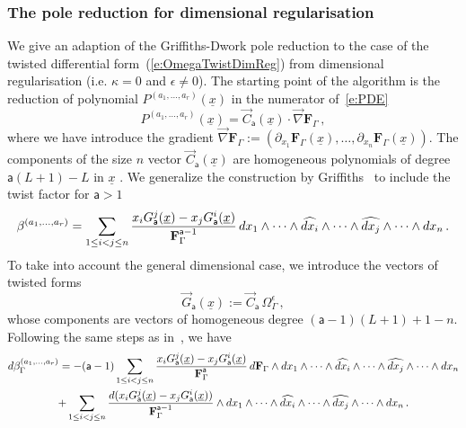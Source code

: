 \documentclass[a4paper,12pt]{article}
\numberwithin{equation}{section}
\numberwithin{figure}{section}
\begin{document}
  \subsubsection{The pole reduction for dimensional
    regularisation}\label{sec:PoleRed}
We give an adaption of the Griffiths-Dwork pole reduction to the case
of the twisted differential form~(\ref{e:OmegaTwistDimReg}) from
dimensional regularisation (i.e. $\kappa=0$ and $\epsilon\neq0$).
The starting point of the algorithm is the reduction of polynomial
$P^{(a_1,\dots,a_r)}(\underline x)$  in the numerator
of~\eqref{e:PDE}
\begin{equation}\label{e:RedF}
	P^{(a_1,\dots,a_r)}(\underline x) = \vec C_{\mathsf{a}}(\underline x)\cdot
	\vec\nabla   \textbf{F}_\Gamma \, ,
      \end{equation}
      where we have introduce the gradient $	\vec\nabla   \textbf{F}_\Gamma :=\left(\partial_{x_1}
      \textbf{F}_\Gamma(\underline x),\dots, \partial_{x_n}
      \textbf{F}_\Gamma(\underline x)\right)$.
%
The components of the size $n$ vector $ \vec C_{\mathsf{a}}(\underline x)$ are homogeneous polynomials of degree
$\mathsf{a}(L+1)-L$ in  $\underline x$ . 
%
   We generalize the construction by
   Griffiths~\cite{Griffith1,Griffith2} to include the twist factor
   for $\mathsf{a}>1$ 
   \begin{equation}\label{e:betadef}
  \beta^{(a_1,\dots,a_r)}=  \sum_{1\leq i<j\leq n} {x_i
    G_{\mathsf{a}}^j  (\underline x)-x_j
   G_{\mathsf{a}}^i(\underline x)\over
  \textbf{F}_\Gamma^{\mathsf{a}-1}}\, 
 dx_1\wedge \cdots \wedge \widehat{dx_i}\wedge \cdots \wedge\widehat{dx_j}\wedge
  \cdots \wedge dx_n \, .
\end{equation}
To take into account the general dimensional case, we introduce 
the vectors of twisted forms
\begin{equation}
  \label{e:Gdef}
\vec  G_{\mathsf{a}}(\underline x):=   \vec C_{\mathsf{a}} \,\Omega_\Gamma^\epsilon \, ,
\end{equation}
whose components are vectors of homogeneous degree $(\mathsf{a}-1)(L+1)+1-n$. 
Following the same steps as in~\cite{Griffiths_1969}, we have
\begin{multline}
  d\beta_\Gamma^{(a_1,\dots,a_r)}=-  (\mathsf{a}-1) \sum_{1\leq i<j\leq n} {x_i
    G_{\mathsf{a}}^j  (\underline x)-x_j
   G_{\mathsf{a}}^i(\underline x)\over
   \textbf{F}_\Gamma^{\mathsf{a}}}\, d \textbf{F}_\Gamma\wedge
 dx_1\wedge \cdots \wedge \widehat{dx_i}\wedge \cdots \wedge\widehat{dx_j}\wedge
 \cdots \wedge dx_n \cr
+  \sum_{1\leq i<j\leq n} {d(x_i
    G_{\mathsf{a}}^j  (\underline x)-x_j
   G_{\mathsf{a}}^i(\underline x))\over
   \textbf{F}_\Gamma^{\mathsf{a}-1}}\wedge
 dx_1\wedge \cdots \wedge \widehat{dx_i}\wedge \cdots \wedge\widehat{dx_j}\wedge
  \cdots \wedge dx_n  \, .
\end{multline}
\end{document}
